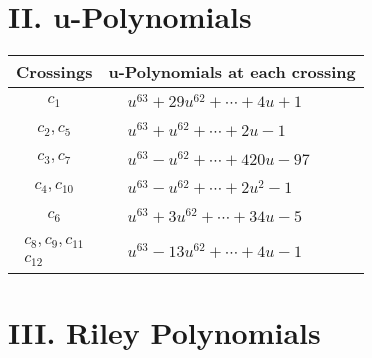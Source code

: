 \documentclass[1p]{elsarticle_modified}
\theoremstyle{definition}
\begin{document}
\newpage\renewcommand{\arraystretch}{1}
\centering \section*{ II. u-Polynomials}
\begin{tabular}{m{50pt}|m{274pt}}
Crossings & \hspace{64pt}u-Polynomials at each crossing \\
\hline $$\begin{aligned}c_{1}\end{aligned}$$&$\begin{aligned}
&u^{63}+29 u^{62}+\cdots+4 u+1
\end{aligned}$\\
\hline $$\begin{aligned}c_{2},c_{5}\end{aligned}$$&$\begin{aligned}
&u^{63}+u^{62}+\cdots+2 u-1
\end{aligned}$\\
\hline $$\begin{aligned}c_{3},c_{7}\end{aligned}$$&$\begin{aligned}
&u^{63}- u^{62}+\cdots+420 u-97
\end{aligned}$\\
\hline $$\begin{aligned}c_{4},c_{10}\end{aligned}$$&$\begin{aligned}
&u^{63}- u^{62}+\cdots+2 u^2-1
\end{aligned}$\\
\hline $$\begin{aligned}c_{6}\end{aligned}$$&$\begin{aligned}
&u^{63}+3 u^{62}+\cdots+34 u-5
\end{aligned}$\\
\hline $$\begin{aligned}c_{8},c_{9},c_{11}\\c_{12}\end{aligned}$$&$\begin{aligned}
&u^{63}-13 u^{62}+\cdots+4 u-1
\end{aligned}$\\
\hline
\end{tabular}\newpage\renewcommand{\arraystretch}{1}
\centering \section*{ III. Riley Polynomials}
\end{document}
